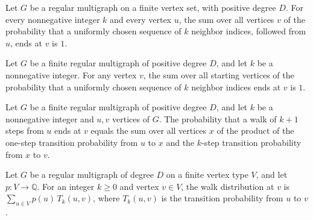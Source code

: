 \begin{theorem}
\label{Randomized.RegularMultigraph.sum_transProb_right}
\leanok
{}
Let $G$ be a regular multigraph on a finite vertex set, with positive degree $D$. For
every nonnegative integer $k$ and every vertex $u$, the sum over all vertices $v$ of the
probability that a uniformly chosen sequence of $k$ neighbor indices, followed from $u$,
ends at $v$ is $1$.
\end{theorem}

\begin{theorem}
\label{Randomized.RegularMultigraph.sum_transProb_left}
\leanok
{}
Let $G$ be a finite regular multigraph of positive degree $D$, and let $k$ be a
nonnegative integer. For any vertex $v$, the sum over all starting vertices of the
probability that a uniformly chosen sequence of $k$ neighbor indices ends at $v$ is $1$.
\end{theorem}

\begin{theorem}
\label{Randomized.RegularMultigraph.transProb_succ_eq_sum}
\leanok
{}
Let $G$ be a finite regular multigraph of positive degree $D$, and let $k$ be a
nonnegative integer and $u,v$ vertices of $G$. The probability that a walk of $k+1$
steps from $u$ ends at $v$ equals the sum over all vertices $x$ of the product of the
one-step transition probability from $u$ to $x$ and the $k$-step transition probability
from $x$ to $v$.
\end{theorem}

\begin{definition}
\label{Randomized.RegularMultigraph.walkDist}
\leanok
{}
Let $G$ be a regular multigraph of degree $D$ on a finite vertex type $V$, and let
$p:V\to\mathbb{Q}$. For an integer $k\ge 0$ and vertex $v\in V$, the walk distribution
at $v$ is $\sum_{u\in V}p(u)\,T_k(u,v)$, where $T_k(u,v)$ is the transition probability
from $u$ to $v$.
\end{definition}

